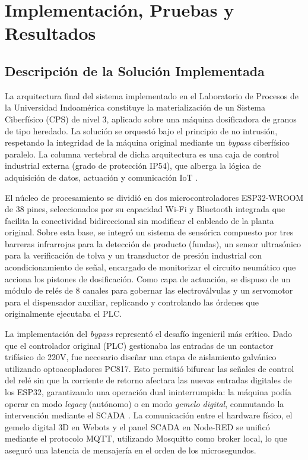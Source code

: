 \chapter{Implementación, Pruebas y Resultados}
\label{chap:implementacion}

\section{Descripción de la Solución Implementada}

La arquitectura final del sistema implementado en el Laboratorio de Procesos de la Universidad Indoamérica constituye la materialización de un Sistema Ciberfísico (CPS) de nivel 3, aplicado sobre una máquina dosificadora de granos de tipo heredado. La solución se orquestó bajo el principio de no intrusión, respetando la integridad de la máquina original mediante un \textit{bypass} ciberfísico paralelo. La columna vertebral de dicha arquitectura es una caja de control industrial externa (grado de protección IP54), que alberga la lógica de adquisición de datos, actuación y comunicación IoT \cite{kritzinger2018}.

El núcleo de procesamiento se dividió en dos microcontroladores ESP32-WROOM de 38 pines, seleccionados por su capacidad Wi-Fi y Bluetooth integrada que facilita la conectividad bidireccional sin modificar el cableado de la planta original. Sobre esta base, se integró un sistema de sensórica compuesto por tres barreras infrarrojas para la detección de producto (fundas), un sensor ultrasónico para la verificación de tolva y un transductor de presión industrial con acondicionamiento de señal, encargado de monitorizar el circuito neumático que acciona los pistones de dosificación. Como capa de actuación, se dispuso de un módulo de relés de 8 canales para gobernar las electroválvulas y un servomotor para el dispensador auxiliar, replicando y controlando las órdenes que originalmente ejecutaba el PLC.

La implementación del \textit{bypass} representó el desafío ingenieril más crítico. Dado que el controlador original (PLC) gestionaba las entradas de un contactor trifásico de 220V, fue necesario diseñar una etapa de aislamiento galvánico utilizando optoacopladores PC817. Esto permitió bifurcar las señales de control del relé sin que la corriente de retorno afectara las nuevas entradas digitales de los ESP32, garantizando una operación dual ininterrumpida: la máquina podía operar en modo \textit{legacy} (autónomo) o en modo \textit{gemelo digital}, conmutando la intervención mediante el SCADA \cite{monostori2016}. La comunicación entre el hardware físico, el gemelo digital 3D en Webots y el panel SCADA en Node-RED se unificó mediante el protocolo MQTT, utilizando Mosquitto como broker local, lo que aseguró una latencia de mensajería en el orden de los microsegundos.

